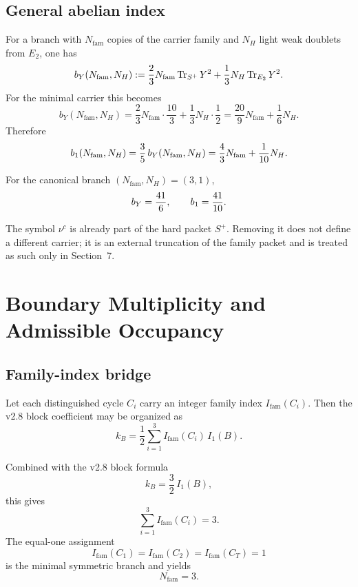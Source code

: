\subsection{General abelian index}

\begin{theorem}
For a branch with $N_{\mathrm{fam}}$ copies of the carrier family and $N_H$ light weak doublets from $E_2$, one has
\[
b_Y(N_{\mathrm{fam}},N_H)
:= \frac23 N_{\mathrm{fam}}\operatorname{Tr}_{S^+}Y^2 + \frac13 N_H\operatorname{Tr}_{E_2}Y^2.
\]
For the minimal carrier this becomes
\[
b_Y(N_{\mathrm{fam}},N_H)
= \frac23 N_{\mathrm{fam}}\cdot\frac{10}{3} + \frac13 N_H\cdot\frac12
= \frac{20}{9}N_{\mathrm{fam}}+\frac16 N_H.
\]
Therefore
\[
b_1(N_{\mathrm{fam}},N_H)
= \frac35\,b_Y(N_{\mathrm{fam}},N_H)
= \frac43 N_{\mathrm{fam}}+\frac1{10}N_H.
\]
\end{theorem}

\begin{corollary}
For the canonical branch $(N_{\mathrm{fam}},N_H)=(3,1)$,
\[
b_Y=\frac{41}{6},
\qquad
b_1=\frac{41}{10}.
\]
\end{corollary}

\begin{remark}
The symbol $\nu^c$ is already part of the hard packet $S^+$. Removing it does not define a different carrier; it is an external truncation of the family packet and is treated as such only in Section~7.
\end{remark}

\section{Boundary Multiplicity and Admissible Occupancy}

\subsection{Family-index bridge}

\begin{conjecture}
Let each distinguished cycle $C_i$ carry an integer family index $I_{\mathrm{fam}}(C_i)$. Then the v2.8 block coefficient may be organized as
\[
k_B = \frac12\sum_{i=1}^{3} I_{\mathrm{fam}}(C_i)\,I_1(B).
\]
\end{conjecture}

Combined with the v2.8 block formula
\[
k_B=\frac32\,I_1(B),
\]
this gives
\[
\sum_{i=1}^{3} I_{\mathrm{fam}}(C_i)=3.
\]
The equal-one assignment
\[
I_{\mathrm{fam}}(C_1)=I_{\mathrm{fam}}(C_2)=I_{\mathrm{fam}}(C_T)=1
\]
is the minimal symmetric branch and yields
\[
N_{\mathrm{fam}}=3.
\]

